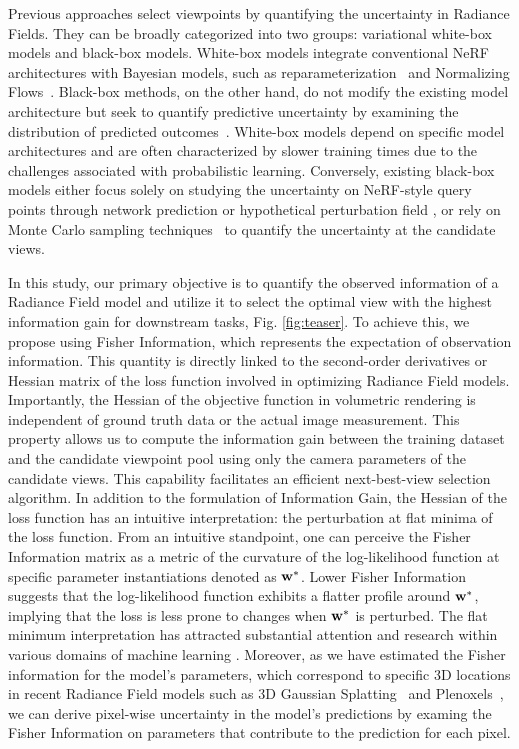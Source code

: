 Previous approaches select viewpoints by quantifying the uncertainty in Radiance Fields. They can be broadly categorized into two groups: variational white-box models and black-box models. White-box models integrate conventional NeRF architectures with Bayesian models, such as reparameterization~\cite{pan2022activenerf,martinbrualla2020nerfw,Ran2023neurar} and Normalizing Flows~\cite{CF-NeRF}. Black-box methods, on the other hand, do not modify the existing model architecture but seek to quantify predictive uncertainty by examining the distribution of predicted outcomes~\cite{zhan2022activermap,lee2022uncertainty, yan2023active-neural-mapping,pan2022activenerf}.
White-box models depend on specific model architectures and are often characterized by slower training times due to the challenges associated with probabilistic learning. Conversely, existing black-box models either focus solely on studying the uncertainty on NeRF-style query points through network prediction \cite{pan2022activenerf} or hypothetical perturbation field \cite{goli2023}, or rely on Monte Carlo sampling techniques~\cite{yan2023active-neural-mapping} to quantify the uncertainty at the candidate views.

In this study, our primary objective is to quantify the observed information of a Radiance Field model and utilize it to select the optimal view with the highest information gain for downstream tasks, Fig. \ref{fig:teaser}. To achieve this, we propose using Fisher Information, which represents the expectation of observation information. This quantity is directly linked to the second-order derivatives or Hessian matrix of the loss function involved in optimizing Radiance Field models. 
Importantly, the Hessian of the objective function in volumetric rendering is independent of ground truth data or the actual image measurement. This property allows us to compute the information gain between the training dataset and the candidate viewpoint pool using only the camera parameters of the candidate views. This capability facilitates an efficient next-best-view selection algorithm.
In addition to the formulation of Information Gain, the Hessian of the loss function has an intuitive interpretation: the perturbation at flat minima of the loss function. From an intuitive standpoint, one can perceive the Fisher Information matrix as a metric of the curvature of the log-likelihood function at specific parameter instantiations denoted as ${\bf w}^*$.
Lower Fisher Information suggests that the log-likelihood function exhibits a flatter profile around ${\bf w}^*$, implying that the loss is less prone to changes when ${\bf w}^*$ is perturbed. The flat minimum interpretation has attracted substantial attention and research within various domains of machine learning \cite{Hinton1993, kirsch2022unifying, HochreiterFlat, SmithSGD, macdonald2023progressive}.
Moreover, as we have estimated the Fisher information for the model's parameters, which correspond to specific 3D locations in recent Radiance Field models such as 3D Gaussian Splatting~\cite{kerbl3Dgaussians} and Plenoxels~\cite{plenoxels}, we can derive pixel-wise uncertainty in the model's predictions by examing the Fisher Information on parameters that contribute to the prediction for each pixel.

